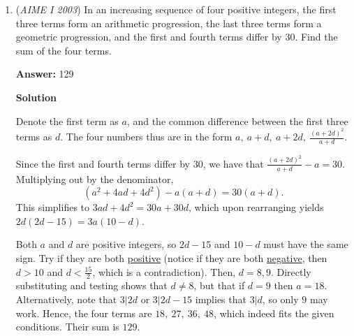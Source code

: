 \begin{enumerate}
Let $AD=c$ and $BD=d$, then by \href{https://artofproblemsolving.com/wiki/index.php?title=Stewart\%27s\_Theorem}{Stewart's Theorem} we have:

 $30d^2+21*9*30=9c^2+21c^2=30c^2$. After simplifying:

 $d^2-c^2=189$.

 The solution follows as above.

 



\textbf{Solution 3 (Law of Cosines)}

Drop an altitude from point $D$ to side $AC$. Let the intersection point be $E$. Since triangle $ADC$ is isosceles, AE is half of $AC$, or $15$. Then, label side AD as $x$. Since $AED$ is a right triangle, you can figure out $\cos A$ with adjacent divided by hypotenuse, which in this case is $AE$ divided by $x$, or $\frac{15}{x}$. Now we apply law of cosines. Label $BD$ as $y$. Applying law  of cosines, $y^2 = x^2+9^2- 2 \cdot x \cdot 9 \cdot \cos A$. Since $\cos A$ is equal to $\frac{15}{x}$, $y^2 = x^2+9^2- 2 \cdot x \cdot 9 \cdot \frac{15}{x}$, which can be simplified to $x^2-y^2=189$. The solution proceeds as the first solution does.

 -intelligence\_20

 


	\item (\textit{AIME I 2003}) In an increasing sequence of four positive integers, the first three terms form an arithmetic progression, the last three terms form a geometric progression, and the first and fourth terms differ by $30.$ Find the sum of the four terms.


 
 \textbf{Answer: }129



\textbf{Solution}

Denote the first term as $a$, and the common difference between the first three terms as $d$. The four numbers thus are in the form $a,\ a+d,\ a+2d,\ \frac{(a + 2d)^2}{a + d}$. 

 Since the first and fourth terms differ by $30$, we have that $\frac{(a + 2d)^2}{a + d} - a = 30$. Multiplying out by the denominator, 
 \[(a^2 + 4ad + 4d^2) - a(a + d) = 30(a + d).\] This simplifies to $3ad + 4d^2 = 30a + 30d$, which upon rearranging yields $2d(2d - 15) = 3a(10 - d)$.

 Both $a$ and $d$ are positive integers, so $2d - 15$ and $10 - d$ must have the same sign. Try if they are both \href{https://artofproblemsolving.com/wiki/index.php?title=Positive}{positive} (notice if they are both \href{https://artofproblemsolving.com/wiki/index.php?title=Negative}{negative}, then $d > 10$ and $d < \frac{15}{2}$, which is a contradiction). Then, $d = 8, 9$. Directly substituting and testing shows that $d \neq 8$, but that if $d = 9$ then $a = 18$. Alternatively, note that $3|2d$ or $3|2d-15$ implies that $3|d$, so only $9$ may work. Hence, the four terms are $18,\ 27,\ 36,\ 48$, which indeed fits the given conditions. Their sum is $\boxed{129}$.


\end{enumerate}
